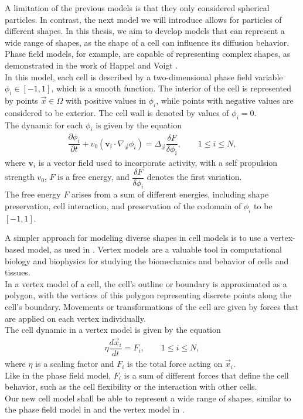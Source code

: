 A limitation of the previous models is that they only considered spherical particles. 
In contrast, the next model we will introduce allows for particles of different shapes. 
In this thesis, we aim to develop models that can represent a wide range of shapes, as the shape of a cell can influence its diffusion behavior. 
Phase field models, for example, are capable of representing complex shapes, as demonstrated in the work of Happel and Voigt \cite{Happel2023}. \\
In this model, each cell is described by a two-dimensional phase field variable $\phi_i \in [-1, 1]$, which is a smooth function. 
The interior of the cell is represented by points $\vec{x} \in \Omega$ with positive values in $\phi_i$, while points with negative values are considered to be exterior. 
The cell wall is denoted by values of $\phi_i = 0$. \\
The dynamic for each $\phi_i$ is given by the equation
\begin{align}
	\dfrac{ \partial \phi_i}{ \partial t} + v_0(\textbf{v}_i \cdot \nabla_{\vec{x}} \phi_i) = \Delta_{\vec{x}} \dfrac{\delta F}{\delta \phi_i}, \qquad 1 \leq i \leq N \label{eq:phasefield},
\end{align}
where $\textbf{v}_i$ is a vector field used to incorporate activity, with a self propulsion strength $v_0$, $F$ is a free energy, and $\dfrac{\delta F}{\delta \phi_i}$ denotes the first variation.\\
The free energy $F$ arises from a sum of different energies, including shape preservation, cell interaction, and preservation of the codomain of $\phi_i$ to be $[-1, 1]$.

A simpler approach for modeling diverse shapes in cell models is to use a vertex-based model, as used in \cite{Fletcher14}. 
Vertex models are a valuable tool in computational biology and biophysics for studying the biomechanics and behavior of cells and tissues. \\
In a vertex model of a cell, the cell's outline or boundary is approximated as a polygon, with the vertices of this polygon representing discrete points along the cell's boundary. 
Movements or transformations of the cell are given by forces that are applied on each vertex individually. \\
The cell dynamic in a vertex model is given by the equation
\begin{align}
	\eta \dfrac{d \vec{x}_i}{dt} = F_i, \qquad 1 \leq i \leq N \label{eq:vertexmodel}, 
\end{align}
where $\eta$ is a scaling factor and $F_i$ is the total force acting on $\vec{x}_i$. \\
Like in the phase field model, $F_i$ is a sum of different forces that define the cell behavior, such as the cell flexibility or the interaction with other cells. \\
Our new cell model shall be able to represent a wide range of shapes, similar to the phase field model in \cite{Happel2023} and the vertex model in \cite{Fletcher14}.


